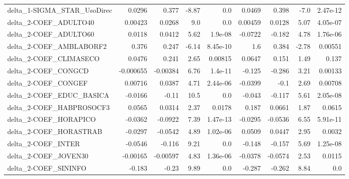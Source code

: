 \begin{tabular}{lrrrrrrrr}
delta\_1-SIGMA\_STAR\_UsoDirec            &      0.0296 &        0.377 &   -8.87 &      0.0 &     0.0469 &       0.398 &         -7.0 &      2.47e-12 \\
delta\_2-COEF\_ADULTO40                  &     0.00423 &       0.0268 &     9.0 &      0.0 &    0.00459 &      0.0128 &         5.07 &      4.05e-07 \\
delta\_2-COEF\_ADULTO60                  &      0.0118 &       0.0412 &    5.62 &  1.9e-08 &    -0.0722 &      -0.182 &         4.78 &      1.76e-06 \\
delta\_2-COEF\_AMBLABORF2                &       0.376 &        0.247 &   -6.14 & 8.45e-10 &        1.6 &       0.384 &        -2.78 &       0.00551 \\
delta\_2-COEF\_CLIMASECO                 &      0.0476 &        0.241 &    2.65 &  0.00815 &     0.0647 &       0.151 &         1.49 &         0.137 \\
delta\_2-COEF\_CONGCD                    &   -0.000655 &     -0.00384 &    6.76 &  1.4e-11 &     -0.125 &      -0.286 &         3.21 &       0.00133 \\
delta\_2-COEF\_CONGEF                    &     0.00716 &       0.0387 &    4.71 & 2.44e-06 &    -0.0399 &        -0.1 &         2.69 &       0.00708 \\
delta\_2-COEF\_EDUC\_BASICA               &     -0.0166 &        -0.11 &    10.5 &      0.0 &     -0.043 &      -0.117 &         5.61 &      2.05e-08 \\
delta\_2-COEF\_HABPROSOCF3               &      0.0565 &       0.0314 &    2.37 &   0.0178 &      0.187 &      0.0661 &         1.87 &        0.0615 \\
delta\_2-COEF\_HORAPICO                  &     -0.0362 &      -0.0922 &    7.39 & 1.47e-13 &    -0.0295 &     -0.0536 &         6.55 &      5.91e-11 \\
delta\_2-COEF\_HORASTRAB                 &     -0.0297 &      -0.0542 &    4.89 & 1.02e-06 &     0.0509 &      0.0447 &         2.95 &        0.0032 \\
delta\_2-COEF\_INTER                     &     -0.0546 &       -0.116 &    9.21 &      0.0 &     -0.148 &      -0.157 &         5.69 &      1.25e-08 \\
delta\_2-COEF\_JOVEN30                   &    -0.00165 &     -0.00597 &    4.83 & 1.36e-06 &    -0.0378 &     -0.0574 &         2.53 &        0.0115 \\
delta\_2-COEF\_SININFO                   &      -0.183 &        -0.23 &    9.89 &      0.0 &     -0.287 &      -0.262 &         8.84 &           0.0 \\

\end{tabular}
